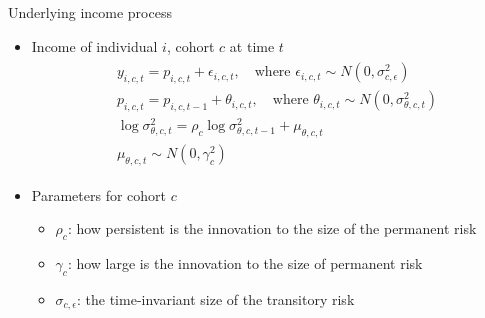\documentclass{beamer}
\begin{document}
\begin{frame}{Underlying income process}
	
	\begin{itemize}
		\item Income of individual $i$, cohort $c$ at time $t$ 
		\begin{eqnarray*}
			\begin{split}
				& y_{i,c,t} = p_{i,c,t}+ \epsilon_{i,c,t},\quad \textrm{where } \epsilon_{i,c,t} \sim N(0,\sigma^2_{c,\epsilon}) \\
				& p_{i,c,t} = p_{i,c,t-1} + \theta_{i,c,t}, \quad \textrm{where }  \theta_{i,c,t} \sim N(0,\sigma^2_{\theta,c,t} ) \\
				& \log\sigma^2_{\theta,c,t} = \rho_c \log\sigma^2_{\theta,c,t-1} + \mu_{\theta,c,t}  \\
				& \mu_{\theta,c,t} \sim N(0,\gamma_c^2)
			\end{split}
		\end{eqnarray*}

	
		\item Parameters for cohort $c$
		\begin{itemize}
			\item $\rho_{c}$: how persistent is the innovation to the size of  the permanent risk  
			\item $\gamma_c$: how large is the innovation to the size of permanent risk
			\item $\sigma_{c,\epsilon}$: the time-invariant size of the transitory risk
		\end{itemize}
	\end{itemize}
\end{frame}
\end{document}
